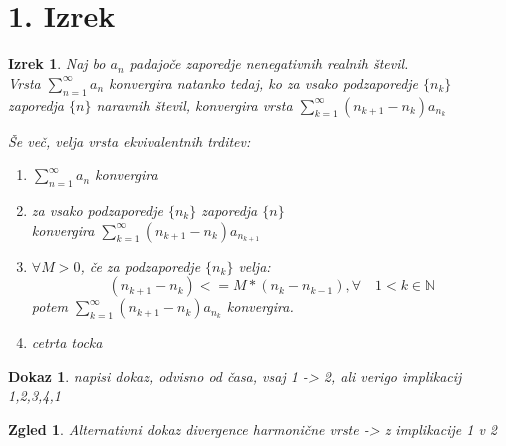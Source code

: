 \documentclass{beamer}
\newtheorem{izrek}{Izrek}
\newtheorem{zgled}{Zgled}
\newtheorem{dokaz}{Dokaz}
\begin{document}
\section{1. Izrek}

\begin{frame}
    \begin{izrek}
        Naj bo ${a_n}$ padajoče zaporedje nenegativnih realnih števil. \\
        
        \vspace{0.15cm}
        Vrsta $\sum_{n = 1}^{\infty}{a_n}$ konvergira natanko tedaj, ko za vsako 
        podzaporedje $\{n_k\}$ zaporedja $\{n\}$ naravnih števil, konvergira vrsta 
        $\sum_{k = 1}^{\infty}{(n_{k+1} - n_k)a_{n_{k}}}$

        \vspace{0.35cm}
        Še več, velja vrsta ekvivalentnih trditev:
        \begin{enumerate}
            \item $\sum_{n = 1}^{\infty}{a_n}$ konvergira
            \item za vsako podzaporedje $\{n_k\}$ zaporedja $\{n\}$ \\
            konvergira $\sum_{k = 1}^{\infty}{(n_{k+1} - n_k)a_{n_{k + 1}}}$
            \item $\forall M > 0$, če za podzaporedje $\{n_k\}$ velja:
            \[
                (n_{k+1} - n_k) <= M * (n_k - n_{k - 1}),  \forall \quad 1 < k \in {\mathbb{N}} 
            \]
            potem $\sum_{k = 1}^{\infty}{(n_{k+1} - n_k)a_{n_{k}}}$ konvergira.
            \item cetrta tocka
        \end{enumerate}
    \end{izrek}
    
\end{frame}
\begin{frame}
    \begin{dokaz}
        napisi dokaz, odvisno od časa, vsaj 1 -> 2, ali verigo implikacij 1,2,3,4,1
    \end{dokaz}
\end{frame}

\begin{frame}
    \begin{zgled}
        Alternativni dokaz divergence harmonične vrste -> z implikacije 1 v 2
    \end{zgled}
\end{frame}
\end{document}
